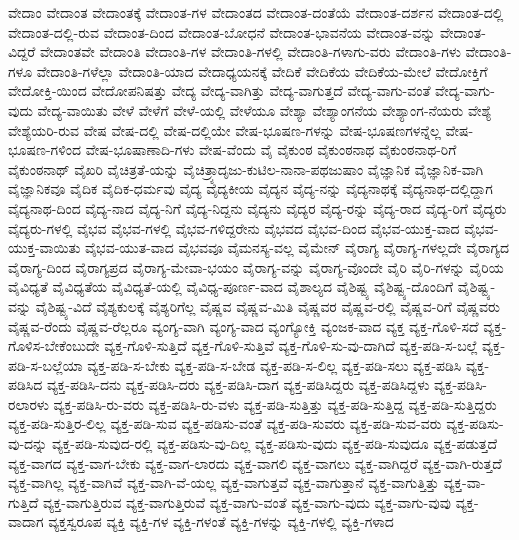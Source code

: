 {ವೇದಾಂ
ವೇದಾಂತ
ವೇದಾಂತಕ್ಕೆ
ವೇದಾಂತ-ಗಳ
ವೇದಾಂತದ
ವೇದಾಂತ-ದಂತೆಯೆ
ವೇದಾಂತ-ದರ್ಶನ
ವೇದಾಂತ-ದಲ್ಲಿ
ವೇದಾಂತ-ದಲ್ಲಿ-ರುವ
ವೇದಾಂತ-ದಿಂದ
ವೇದಾಂತ-ಬೋಧನೆ
ವೇದಾಂತ-ಭಾವನೆಯ
ವೇದಾಂತ-ವನ್ನು
ವೇದಾಂತ-ವಿದ್ದರೆ
ವೇದಾಂತವೇ
ವೇದಾಂತಿ
ವೇದಾಂತಿ-ಗಳ
ವೇದಾಂತಿ-ಗಳಲ್ಲಿ
ವೇದಾಂತಿ-ಗಳಾಗು-ವರು
ವೇದಾಂತಿ-ಗಳು
ವೇದಾಂತಿ-ಗಳೂ
ವೇದಾಂತಿ-ಗಳೆಲ್ಲಾ
ವೇದಾಂತಿ-ಯಾದ
ವೇದಾಧ್ಯಯನಕ್ಕೆ
ವೇದಿಕೆ
ವೇದಿಕೆಯ
ವೇದಿಕೆಯ-ಮೇಲೆ
ವೇದೋಕ್ತಿಗೆ
ವೇದೋಕ್ತಿ-ಯಿಂದ
ವೇದೋಪನಿಷತ್ತು
ವೇದ್ಯ
ವೇದ್ಯ-ವಾಗಿತ್ತು
ವೇದ್ಯ-ವಾಗುತ್ತದೆ
ವೇದ್ಯ-ವಾಗು-ವಂತೆ
ವೇದ್ಯ-ವಾಗು-ವುದು
ವೇದ್ಯ-ವಾಯಿತು
ವೇಳೆ
ವೇಳೆಗೆ
ವೇಳೆ-ಯಲ್ಲಿ
ವೇಳೆಯೂ
ವೇಶ್ಯಾ
ವೇಶ್ಯಾಂಗನೆಯ
ವೇಶ್ಯಾಂಗ-ನೆಯರು
ವೇಶ್ಯೆ
ವೇಶ್ಯೆಯರಿ-ರುವ
ವೇಷ
ವೇಷ-ದಲ್ಲಿ
ವೇಷ-ದಲ್ಲಿಯೇ
ವೇಷ-ಭೂಷಣ-ಗಳನ್ನು
ವೇಷ-ಭೂಷಣಗಳನ್ನೆಲ್ಲ
ವೇಷ-ಭೂಷಣ-ಗಳಿಂದ
ವೇಷ-ಭೂಷಾಣಾದಿ-ಗಳು
ವೇಷ-ವೆಂದು
ವೈ
ವೈಕುಂಠ
ವೈಕುಂಠನಾಥ
ವೈಕುಂಠನಾಥ-ರಿಗೆ
ವೈಕುಂಠನಾಥ್
ವೈಖರಿ
ವೈಚಿತ್ರತೆ-ಯನ್ನು
ವೈಚಿತ್ರ್ಯಾದೃಜು-ಕುಟಿಲ-ನಾನಾ-ಪಥಜುಷಾಂ
ವೈಜ್ಞಾನಿಕ
ವೈಜ್ಞಾನಿಕ-ವಾಗಿ
ವೈಜ್ಞಾನಿಕವೂ
ವೈದಿಕ
ವೈದಿಕ-ಧರ್ಮವು
ವೈದ್ಯ
ವೈದ್ಯಕೀಯ
ವೈದ್ಯನ
ವೈದ್ಯ-ನನ್ನು
ವೈದ್ಯನಾಥಕ್ಕೆ
ವೈದ್ಯನಾಥ-ದಲ್ಲಿದ್ದಾಗ
ವೈದ್ಯನಾಥ-ದಿಂದ
ವೈದ್ಯ-ನಾದ
ವೈದ್ಯ-ನಿಗೆ
ವೈದ್ಯ-ನಿದ್ದನು
ವೈದ್ಯನು
ವೈದ್ಯರ
ವೈದ್ಯ-ರನ್ನು
ವೈದ್ಯ-ರಾದ
ವೈದ್ಯ-ರಿಗೆ
ವೈದ್ಯರು
ವೈದ್ಯರು-ಗಳಲ್ಲಿ
ವೈಭವ
ವೈಭವ-ಗಳಲ್ಲಿ
ವೈಭವ-ಗಳಿದ್ದರೇನು
ವೈಭವದ
ವೈಭವ-ದಿಂದ
ವೈಭವ-ಯುಕ್ತ-ವಾದ
ವೈಭವ-ಯುಕ್ತ-ವಾಯಿತು
ವೈಭವ-ಯುತ-ವಾದ
ವೈಭವವೂ
ವೈಮನಸ್ಯ-ವಲ್ಲ
ವೈಮೇನ್
ವೈರಾಗ್ಯ
ವೈರಾಗ್ಯ-ಗಳಲ್ಲದೇ
ವೈರಾಗ್ಯದ
ವೈರಾಗ್ಯ-ದಿಂದ
ವೈರಾಗ್ಯಪ್ರದ
ವೈರಾಗ್ಯ-ಮೇವಾ-ಭಯಂ
ವೈರಾಗ್ಯ-ವನ್ನು
ವೈರಾಗ್ಯ-ವೊಂದೇ
ವೈರಿ
ವೈರಿ-ಗಳನ್ನು
ವೈರಿಯ
ವೈವಿಧ್ಯತೆ
ವೈವಿಧ್ಯತೆಯ
ವೈವಿಧ್ಯತೆ-ಯಲ್ಲಿ
ವೈವಿಧ್ಯ-ಪೂರ್ಣ-ವಾದ
ವೈಶಾಲ್ಯದ
ವೈಶಿಷ್ಟ್ಯ
ವೈಶಿಷ್ಟ್ಯ-ದೊಂದಿಗೆ
ವೈಶಿಷ್ಟ್ಯ-ವನ್ನು
ವೈಶಿಷ್ಟ್ಯ-ವಿದೆ
ವೈಶ್ಯಕುಲಕ್ಕೆ
ವೈಶ್ಯರಿಗೆಲ್ಲ
ವೈಷ್ಣವ
ವೈಷ್ಣವ-ಮಿತಿ
ವೈಷ್ಣವರ
ವೈಷ್ಣವ-ರಲ್ಲಿ
ವೈಷ್ಣವ-ರಿಗೆ
ವೈಷ್ಣವರು
ವೈಷ್ಣವ-ರೆಂದು
ವೈಷ್ಣವ-ರೆಲ್ಲರೂ
ವ್ಯಂಗ್ಯ-ವಾಗಿ
ವ್ಯಂಗ್ಯ-ವಾದ
ವ್ಯಂಗ್ಯೋಕ್ತಿ
ವ್ಯಂಜಕ-ವಾದ
ವ್ಯಕ್ತ
ವ್ಯಕ್ತ-ಗೊಳಿ-ಸದೆ
ವ್ಯಕ್ತ-ಗೊಳಿಸ-ಬೇಕೆಂಬುದೇ
ವ್ಯಕ್ತ-ಗೊಳಿ-ಸುತ್ತಿದೆ
ವ್ಯಕ್ತ-ಗೊಳಿ-ಸುತ್ತಿವೆ
ವ್ಯಕ್ತ-ಗೊಳಿ-ಸು-ವು-ದಾಗಿದೆ
ವ್ಯಕ್ತ-ಪಡಿ-ಸ-ಬಲ್ಲೆ
ವ್ಯಕ್ತ-ಪಡಿ-ಸ-ಬಲ್ಲೆಯಾ
ವ್ಯಕ್ತ-ಪಡಿ-ಸ-ಬೇಕು
ವ್ಯಕ್ತ-ಪಡಿ-ಸ-ಬೇಡ
ವ್ಯಕ್ತ-ಪಡಿ-ಸ-ಲಿಲ್ಲ
ವ್ಯಕ್ತ-ಪಡಿ-ಸಲು
ವ್ಯಕ್ತ-ಪಡಿಸಿ
ವ್ಯಕ್ತ-ಪಡಿಸಿದ
ವ್ಯಕ್ತ-ಪಡಿಸಿ-ದನು
ವ್ಯಕ್ತ-ಪಡಿಸಿ-ದರು
ವ್ಯಕ್ತ-ಪಡಿಸಿ-ದಾಗ
ವ್ಯಕ್ತ-ಪಡಿಸಿದ್ದರು
ವ್ಯಕ್ತ-ಪಡಿಸಿದ್ದಳು
ವ್ಯಕ್ತ-ಪಡಿಸಿ-ರಲಾರಳು
ವ್ಯಕ್ತ-ಪಡಿಸಿ-ರು-ವರು
ವ್ಯಕ್ತ-ಪಡಿಸಿ-ರು-ವಳು
ವ್ಯಕ್ತ-ಪಡಿ-ಸುತ್ತಿತ್ತು
ವ್ಯಕ್ತ-ಪಡಿ-ಸುತ್ತಿದ್ದ
ವ್ಯಕ್ತ-ಪಡಿ-ಸುತ್ತಿದ್ದರು
ವ್ಯಕ್ತ-ಪಡಿ-ಸುತ್ತಿರ-ಲಿಲ್ಲ
ವ್ಯಕ್ತ-ಪಡಿ-ಸುವ
ವ್ಯಕ್ತ-ಪಡಿಸು-ವಂತೆ
ವ್ಯಕ್ತ-ಪಡಿ-ಸುವರು
ವ್ಯಕ್ತ-ಪಡಿ-ಸುವ-ವರು
ವ್ಯಕ್ತ-ಪಡಿಸು-ವು-ದನ್ನು
ವ್ಯಕ್ತ-ಪಡಿ-ಸುವುದ-ರಲ್ಲಿ
ವ್ಯಕ್ತ-ಪಡಿಸು-ವು-ದಿಲ್ಲ
ವ್ಯಕ್ತ-ಪಡಿಸು-ವುದು
ವ್ಯಕ್ತ-ಪಡಿ-ಸುವುದೂ
ವ್ಯಕ್ತ-ಪಡುತ್ತದೆ
ವ್ಯಕ್ತ-ವಾಗದ
ವ್ಯಕ್ತ-ವಾಗ-ಬೇಕು
ವ್ಯಕ್ತ-ವಾಗ-ಲಾರದು
ವ್ಯಕ್ತ-ವಾಗಲಿ
ವ್ಯಕ್ತ-ವಾಗಲು
ವ್ಯಕ್ತ-ವಾಗಿದ್ದರೆ
ವ್ಯಕ್ತ-ವಾಗಿ-ರುತ್ತದೆ
ವ್ಯಕ್ತ-ವಾಗಿಲ್ಲ
ವ್ಯಕ್ತ-ವಾಗಿವೆ
ವ್ಯಕ್ತ-ವಾಗಿ-ವೆ-ಯಲ್ಲ
ವ್ಯಕ್ತ-ವಾಗುತ್ತವೆ
ವ್ಯಕ್ತ-ವಾಗುತ್ತಾನೆ
ವ್ಯಕ್ತ-ವಾಗುತ್ತಿತ್ತು
ವ್ಯಕ್ತ-ವಾ-ಗುತ್ತಿದೆ
ವ್ಯಕ್ತ-ವಾಗುತ್ತಿರುವ
ವ್ಯಕ್ತ-ವಾಗುತ್ತಿರುವೆ
ವ್ಯಕ್ತ-ವಾಗು-ವಂತೆ
ವ್ಯಕ್ತ-ವಾಗು-ವುದು
ವ್ಯಕ್ತ-ವಾಗು-ವುವು
ವ್ಯಕ್ತ-ವಾದಾಗ
ವ್ಯಕ್ತಸ್ವರೂಪ
ವ್ಯಕ್ತಿ
ವ್ಯಕ್ತಿ-ಗಳ
ವ್ಯಕ್ತಿ-ಗಳಂತೆ
ವ್ಯಕ್ತಿ-ಗಳನ್ನು
ವ್ಯಕ್ತಿ-ಗಳಲ್ಲಿ
ವ್ಯಕ್ತಿ-ಗಳಾದ
}
